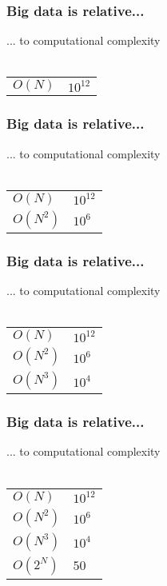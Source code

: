 \documentclass{beamer}
\begin{document}
\begin{frame}
	\frametitle{Big data is relative...}
	\begin{center}
		... to computational complexity\\~\\
		\begin{tabular}{ l l }
			$O(N)$ & $10^{12}$ \\
		\end{tabular}
	\end{center}
\end{frame}

\begin{frame}
	\frametitle{Big data is relative...}
	\begin{center}
		... to computational complexity\\~\\
		\begin{tabular}{ l l }
			$O(N)$ & $10^{12}$ \\
			$O(N^2) $ & $ 10^{6}$\\
		\end{tabular}
	\end{center}
\end{frame}

\begin{frame}
	\frametitle{Big data is relative...}
	\begin{center}
		... to computational complexity\\~\\
		\begin{tabular}{ l l }
			$O(N)$ & $10^{12}$ \\
			$O(N^2) $ & $ 10^{6}$\\
			$O(N^3) $ & $ 10^{4}$\\			
		\end{tabular}
	\end{center}
\end{frame}

\begin{frame}
	\frametitle{Big data is relative...}
	\begin{center}
		... to computational complexity\\~\\
		\begin{tabular}{ l l }
			$O(N)$ & $10^{12}$ \\
			$O(N^2) $ & $ 10^{6}$\\
			$O(N^3) $ & $ 10^{4}$\\
			$O(2^N) $ & $ 50$\\				
		\end{tabular}
	\end{center}
\end{frame}
\end{document}
